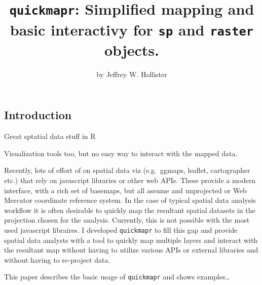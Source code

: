 \title{\texttt{quickmapr}: Simplified mapping and basic interactivy for
\texttt{sp} and \texttt{raster} objects.}
\author{by Jeffrey W. Hollister}

\maketitle


\subsection{Introduction}\label{introduction}

Great sptatial data stuff in R

Visualization tools too, but no easy way to interact with the mapped
data.

Recently, lots of effort of on spatial data viz (e.g.~ggmaps, leaflet,
cartographer etc.) that rely on javascript libraries or other web APIs.
These provide a modern interface, with a rich set of basemaps, but all
assume and unprojected or Web Mercator coordinate reference system. In
the case of typical spatial data analysis workflow it is often desirable
to quickly map the resultant spatial datasets in the projection chosen
for the analysis. Currently, this is not possible with the most used
javascript libraires. I developed \texttt{quickmapr} to fill this gap
and provide spatial data analysts with a tool to quickly map multiple
layers and interact with the resultant map without having to utilize
various APIs or external libraries and without having to re-project
data.

This paper describes the basic usage of \texttt{quickmapr} and shows
examples\ldots{}


